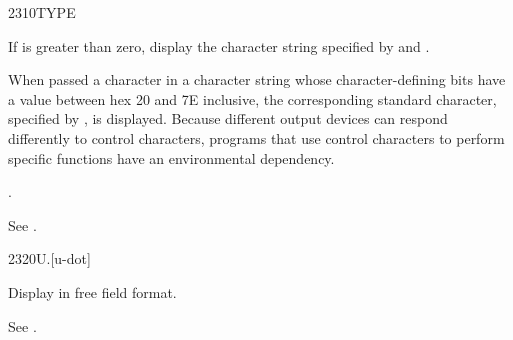 \vspace*{-6ex}
\begin{worddef}{2310}{TYPE}
\item {}

	If  is greater than zero, display the character string
	specified by  and .

	When passed a character in a character string whose
	character-defining bits have a value between hex 20 and 7E
	inclusive, the corresponding standard character, specified
	by , is displayed.
	Because different output devices can respond differently to
	control characters, programs that use control characters to
	perform specific functions have an environmental dependency.

\see {}.

	\begin{testing} %
		See .
	\end{testing}
\end{worddef}

\vspace*{-3ex}
\begin{worddef}[Ud]{2320}{U.{}}[u-dot]
\item {}

	Display  in free field format.

	\begin{testing} %
		See .
	\end{testing}
\end{worddef}

